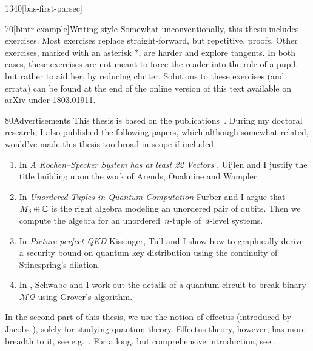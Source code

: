 \begin{parsec}{1340}[bas-first-parsec]
\begin{point}{70}[bintr-example]{Writing style}
Somewhat unconventionally, this thesis includes exercises.
Most exercises replace straight-forward, but repetitive, proofs.
Other exercises, marked with an asterisk *,
    are harder and explore tangents.
In both cases, these exercises are not meant to force the reader into the
    role of a pupil, but rather to aid her, by reducing clutter.
Solutions to these exercises (and errata)
    can be found at the end of the online version of this text
    available on arXiv under
    \href{https://arxiv.org/abs/1803.01911}{1803.01911}.
\end{point}
\begin{point}{80}{Advertisements}%
This thesis is based on the publications~\cite{wwpaschke,westerbaan2016universal,cho2015quotient,statesofconvexsets}.
During my doctoral research,
    I also published the following papers,
    which although somewhat related,
    would've made this thesis too broad in scope if included.
\begin{enumerate}
    \item In \emph{A Kochen--Specker System has at least 22 Vectors} \cite{uijlen2016kochen},
        Uijlen and I justify the title building upon the work
        of Arends, Ouaknine and Wampler.
\item 
    In \emph{Unordered Tuples in Quantum Computation} \cite{bags}
        Furber and I argue that~$M_3 \oplus \mathbb{C}$ is the right algebra
        modeling an unordered pair of qubits.  Then we compute
        the algebra for an unordered~$n$-tuple of~$d$-level systems.
\item
    In \emph{Picture-perfect QKD} \cite{kissinger2017picture}
        Kissinger, Tull and I show how to graphically derive a security
        bound on quantum key distribution using the continuity of Stinespring's dilation.
\item
    In \cite{schwabe2016solving}, Schwabe and I
            work out the details of a quantum circuit
            to break binary~$\mathcal{MQ}$ using Grover's algorithm.
\end{enumerate}
In the second part of this thesis,
    we
 use the notion of effectus (introduced by Jacobs \cite{newdirections}),
    solely for studying quantum theory.
Effectus theory, however, has more breadth to it,
 see e.g.~\cite{jacobs2017quantum,
cho2017disintegration,
adams2015type,
jacobs2016hyper,
jacobs2017channel,
jacobs2017formal,
cho2017efprob,
jacobs2017probability,
jacobs2017recipe,
jacobs2016effectuses,
jacobs2016affine,
jacobs2017distances,
jacobs2015effect}.
For a long, but comprehensive introduction, see \cite{effintro}.

\end{point}
\end{parsec}
